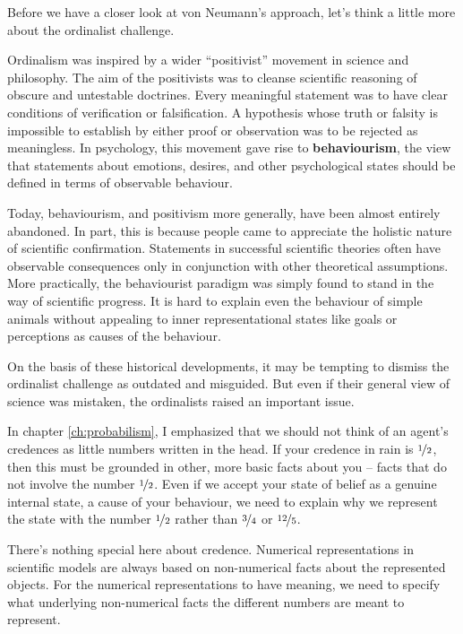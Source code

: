 Before we have a closer look at von Neumann's approach, let's think a little
more about the ordinalist challenge.

Ordinalism was inspired by a wider ``positivist'' movement in science and
philosophy. The aim of the positivists was to cleanse scientific reasoning of
obscure and untestable doctrines. Every meaningful statement was to have clear
conditions of verification or falsification. A hypothesis whose truth or falsity
is impossible to establish by either proof or observation was to be rejected as
meaningless. In psychology, this movement gave rise to \textbf{behaviourism},
the view that statements about emotions, desires, and other psychological states
should be defined in terms of observable behaviour.

Today, behaviourism, and positivism more generally, have been almost entirely
abandoned. In part, this is because people came to appreciate the holistic
nature of scientific confirmation. Statements in successful scientific theories
often have observable consequences only in conjunction with other theoretical
assumptions. More practically, the behaviourist paradigm was simply found to
stand in the way of scientific progress. It is hard to explain even the
behaviour of simple animals without appealing to inner representational states
like goals or perceptions as causes of the behaviour.

On the basis of these historical developments, it may be tempting to dismiss the
ordinalist challenge as outdated and misguided. But even if their general view
of science was mistaken, the ordinalists raised an important issue.

In chapter \ref{ch:probabilism}, I emphasized that we should not think of an
agent's credences as little numbers written in the head. If your credence in
rain is \( \nicefrac{1}{2}\), then this must be grounded in other, more basic
facts about you -- facts that do not involve the number \( \nicefrac{1}{2}\).
Even if we accept your state of belief as a genuine internal state, a cause of
your behaviour, we need to explain why we represent the state with the number
\(\nicefrac{1}{2}\) rather than \(\nicefrac{3}{4}\) or \(\nicefrac{12}{5}\).

There's nothing special here about credence. Numerical representations in
scientific models are always based on non-numerical facts about the represented
objects. For the numerical representations to have meaning, we need to specify
what underlying non-numerical facts the different numbers are meant to
represent.


